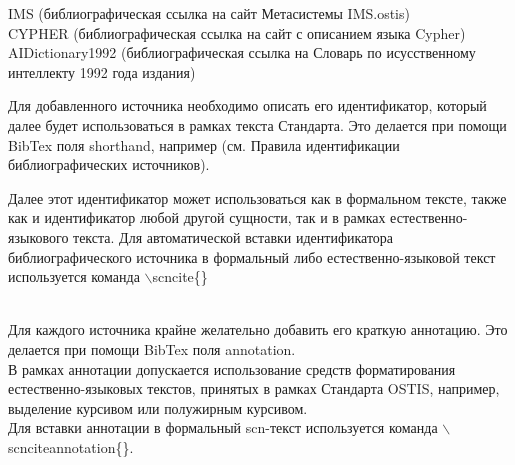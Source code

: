 {{{\begin{scnitemizeii}
{						IMS (библиографическая ссылка на сайт Метасистемы IMS.ostis)\\
						CYPHER (библиографическая ссылка на сайт с описанием языка Cypher)\\
						AIDictionary1992 (библиографическая ссылка на Словарь по исусственному интеллекту 1992 года издания)\\}
					\item Для добавленного источника необходимо описать его идентификатор, который далее будет использоваться в рамках текста Стандарта. Это делается при помощи BibTex поля shorthand, например (см. Правила идентификации библиографических источников).\\
					\item Далее этот идентификатор может использоваться как в формальном тексте, также как и идентификатор любой другой сущности, так и в рамках естественно-языкового текста. Для автоматической вставки идентификатора библиографического источника в формальный либо естественно-языковой текст используется команда $\backslash$scncite\{<цитатный ключ>\}\\\\
					\item Для каждого источника крайне желательно добавить его краткую аннотацию. Это делается при помощи BibTex поля annotation.\\
					В рамках аннотации допускается использование средств форматирования естественно-языковых текстов, принятых в рамках Стандарта OSTIS, например, выделение курсивом или полужирным курсивом.\\
					Для вставки аннотации в формальный scn-текст используется команда $\backslash$scnciteannotation\{<цитатный ключ>\}.\\
\end{scnitemizeii}}}}
